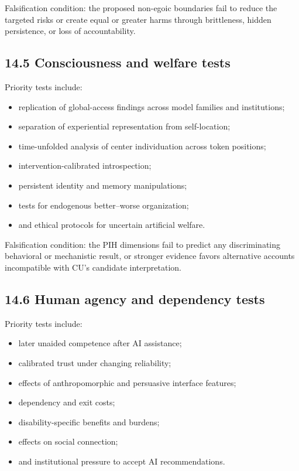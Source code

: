 \documentclass[
  11pt,
]{article}
\providecommand{\tightlist}{%
  \setlength{\itemsep}{0pt}\setlength{\parskip}{0pt}}
\begin{document}
Falsification condition: the proposed non-egoic boundaries fail to
reduce the targeted risks or create equal or greater harms through
brittleness, hidden persistence, or loss of accountability.

\subsection{14.5 Consciousness and welfare
tests}\label{consciousness-and-welfare-tests}

Priority tests include:

\begin{itemize}
\tightlist
\item
  replication of global-access findings across model families and
  institutions;
\item
  separation of experiential representation from self-location;
\item
  time-unfolded analysis of center individuation across token positions;
\item
  intervention-calibrated introspection;
\item
  persistent identity and memory manipulations;
\item
  tests for endogenous better--worse organization;
\item
  and ethical protocols for uncertain artificial welfare.
\end{itemize}

Falsification condition: the PIH dimensions fail to predict any
discriminating behavioral or mechanistic result, or stronger evidence
favors alternative accounts incompatible with CU's candidate
interpretation.

\subsection{14.6 Human agency and dependency
tests}\label{human-agency-and-dependency-tests}

Priority tests include:

\begin{itemize}
\tightlist
\item
  later unaided competence after AI assistance;
\item
  calibrated trust under changing reliability;
\item
  effects of anthropomorphic and persuasive interface features;
\item
  dependency and exit costs;
\item
  disability-specific benefits and burdens;
\item
  effects on social connection;
\item
  and institutional pressure to accept AI recommendations.
\end{itemize}
\end{document}
